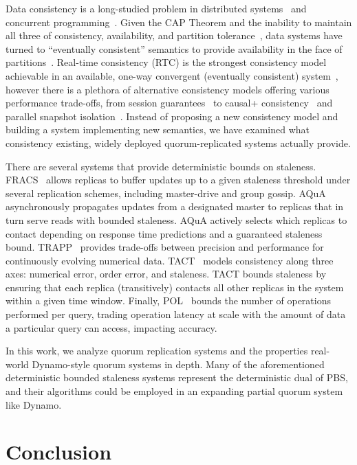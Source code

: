 \documentclass{vldb}
\newcommand{\sectionskip}{-0em}
\begin{document}
Data consistency is a long-studied problem in distributed
systems~\cite{consistency-partitioned, danger-rep} and concurrent
programming~\cite{linearizability}.  Given the CAP Theorem and the
inability to maintain all three of consistency, availability, and
partition tolerance~\cite{cap-proof}, data systems have turned to
``eventually consistent'' semantics to provide availability in the
face of partitions~\cite{consistency-partitioning, vogels-defs}.
Real-time consistency (RTC) is the strongest consistency model
achievable in an available, one-way convergent (eventually consistent)
system~\cite{rtc-proof}, however there is a plethora of alternative
consistency models offering various performance trade-offs, from
session guarantees~\cite{sessionguarantees} to causal+
consistency~\cite{cops} and parallel snapshot isolation~\cite{walter}.
Instead of proposing a new consistency model and building a system
implementing new semantics, we have examined what consistency
existing, widely deployed quorum-replicated systems actually provide.

There are several systems that provide deterministic bounds on
staleness.  FRACS~\cite{frac} allows replicas to buffer updates up to
a given staleness threshold under several replication schemes,
including master-drive and group gossip.  AQuA~\cite{aqua}
asynchronously propagates updates from a designated master to replicas
that in turn serve reads with bounded staleness.  AQuA actively
selects which replicas to contact depending on response time
predictions and a guaranteed staleness bound.  TRAPP~\cite{trapp}
provides trade-offs between precision and performance for continuously
evolving numerical data.  TACT~\cite{vahdat-article, vahdat-bounded}
models consistency along three axes: numerical error, order error, and
staleness.  TACT bounds staleness by ensuring that each replica
(transitively) contacts all other replicas in the system within a
given time window.  Finally, POL~\cite{piql} bounds the number of
operations performed per query, trading operation latency at scale
with the amount of data a particular query can access, impacting
accuracy.

In this work, we analyze quorum replication systems and the properties
real-world Dynamo-style quorum systems in depth.  Many of the
aforementioned deterministic bounded staleness systems represent the
deterministic dual of PBS, and their algorithms could be employed in
an expanding partial quorum system like Dynamo.

\vspace{\sectionskip}\section{Conclusion}
\label{sec:conclusion}
\end{document}
